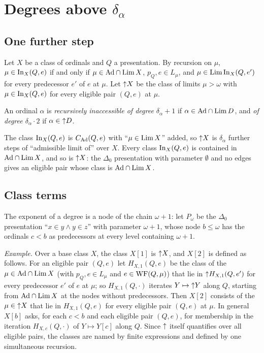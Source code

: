 \documentclass[11pt]{article}
\begin{document}
\section{\texorpdfstring{Degrees above $\delta_\alpha$}{Degrees above delta alpha}}

\subsection{One further step}

\begin{statement} Let $X$ be a class of ordinals and $Q$ a presentation. By recursion on $\mu$,
$\mu \in \mathrm{In}_X(Q, e)$ if and only if $\mu \in \mathrm{Ad} \cap \mathrm{Lim}\, X$, $p_Q, e \in L_\mu$, and $\mu \in \mathrm{Lim}\, \mathrm{In}_X(Q, e')$ for
every predecessor $e'$ of $e$ at $\mu$. Let ${\uparrow} X$ be the class of limits $\mu > \omega$ with $\mu \in \mathrm{In}_X(Q, e)$ for
every eligible pair $(Q, e)$ at $\mu$.

An ordinal $\alpha$ is \emph{recursively inaccessible of degree $\delta_\alpha + 1$} if $\alpha \in \mathrm{Ad} \cap \mathrm{Lim}\, D$, and
\emph{of degree $\delta_\alpha \cdot 2$} if $\alpha \in {\uparrow} D$.
\end{statement}

The class $\mathrm{In}_X(Q,e)$ is $C_{\mathrm{Ad}}(Q,e)$ with ``$\mu \in \mathrm{Lim}\, X$'' added, so ${\uparrow} X$ is $\delta_\alpha$ further steps of
``admissible limit of'' over $X$. Every class $\mathrm{In}_X(Q,e)$ is contained in $\mathrm{Ad} \cap \mathrm{Lim}\, X$, and so is ${\uparrow} X$: the
$\Delta_0$ presentation with parameter $\emptyset$ and no edges gives an eligible pair whose class is $\mathrm{Ad} \cap \mathrm{Lim}\, X$.

\subsection{Class terms}

The exponent of a degree is a node of the chain $\omega + 1$: let $P_\omega$ be the $\Delta_0$ presentation ``$x \in y
\wedge y \in z$'' with parameter $\omega+1$, whose node $b \le \omega$ has the ordinals $c < b$ as predecessors at every
level containing $\omega + 1$.

\emph{Example.} Over a base class $X$, the class $X[1]$ is ${\uparrow} X$, and $X[2]$ is defined as follows. For an eligible
pair $(Q, e)$ let $H_{X,1}(Q, e)$ be the class of the $\mu \in \mathrm{Ad} \cap \mathrm{Lim}\, X$ (with $p_Q, e \in L_\mu$ and $e \in
\mathrm{WF}(Q,\mu)$) that lie in ${\uparrow} H_{X,1}(Q, e')$ for every predecessor $e'$ of $e$ at $\mu$; so $H_{X,1}(Q, \cdot)$
iterates $Y \mapsto {\uparrow} Y$ along $Q$, starting from $\mathrm{Ad} \cap \mathrm{Lim}\, X$ at the nodes without predecessors. Then $X[2]$
consists of the $\mu \in {\uparrow} X$ that lie in $H_{X,1}(Q,e)$ for every eligible pair $(Q,e)$ at $\mu$. In general $X[b]$
asks, for each $c < b$ and each eligible pair $(Q,e)$, for membership in the iteration $H_{X,c}(Q, \cdot)$ of $Y \mapsto
Y[c]$ along $Q$. Since ${\uparrow}$ itself quantifies over all eligible pairs, the classes are named by finite expressions and
defined by one simultaneous recursion.
\end{document}

